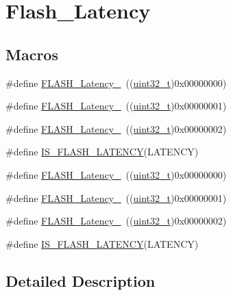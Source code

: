 \hypertarget{group___flash___latency}{}\section{Flash\+\_\+\+Latency}
\label{group___flash___latency}
\subsection*{Macros}
\begin{DoxyCompactItemize}
\item 
\#define \hyperlink{group___flash___latency_ga09afe6e52b819cc074f6111ec42ac3c3}{F\+L\+A\+S\+H\+\_\+\+Latency\+\_}~((\hyperlink{_p_e___types_8h_a33594304e786b158f3fb30289278f5af}{uint32\+\_\+t})0x00000000)
\item 
\#define \hyperlink{group___flash___latency_ga6b7281665340fe8f7919bdfcfd06f8e6}{F\+L\+A\+S\+H\+\_\+\+Latency\+\_}~((\hyperlink{_p_e___types_8h_a33594304e786b158f3fb30289278f5af}{uint32\+\_\+t})0x00000001)
\item 
\#define \hyperlink{group___flash___latency_ga55173ebb5c978459ce18d5e2516e3e89}{F\+L\+A\+S\+H\+\_\+\+Latency\+\_}~((\hyperlink{_p_e___types_8h_a33594304e786b158f3fb30289278f5af}{uint32\+\_\+t})0x00000002)
\item 
\#define \hyperlink{group___flash___latency_gafcbd098d482318a622a58bf168547389}{I\+S\+\_\+\+F\+L\+A\+S\+H\+\_\+\+L\+A\+T\+E\+N\+CY}(L\+A\+T\+E\+N\+CY)
\item 
\#define \hyperlink{group___flash___latency_ga09afe6e52b819cc074f6111ec42ac3c3}{F\+L\+A\+S\+H\+\_\+\+Latency\+\_}~((\hyperlink{_p_e___types_8h_a33594304e786b158f3fb30289278f5af}{uint32\+\_\+t})0x00000000)
\item 
\#define \hyperlink{group___flash___latency_ga6b7281665340fe8f7919bdfcfd06f8e6}{F\+L\+A\+S\+H\+\_\+\+Latency\+\_}~((\hyperlink{_p_e___types_8h_a33594304e786b158f3fb30289278f5af}{uint32\+\_\+t})0x00000001)
\item 
\#define \hyperlink{group___flash___latency_ga55173ebb5c978459ce18d5e2516e3e89}{F\+L\+A\+S\+H\+\_\+\+Latency\+\_}~((\hyperlink{_p_e___types_8h_a33594304e786b158f3fb30289278f5af}{uint32\+\_\+t})0x00000002)
\item 
\#define \hyperlink{group___flash___latency_gafcbd098d482318a622a58bf168547389}{I\+S\+\_\+\+F\+L\+A\+S\+H\+\_\+\+L\+A\+T\+E\+N\+CY}(L\+A\+T\+E\+N\+CY)
\end{DoxyCompactItemize}


\subsection{Detailed Description}


